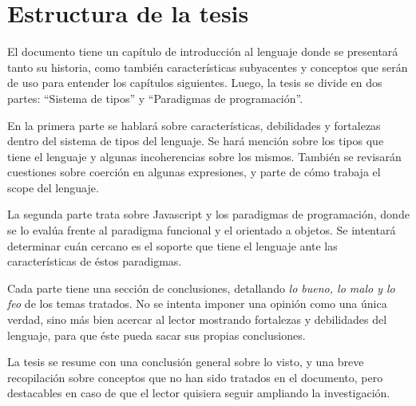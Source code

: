 
\section{Estructura de la tesis}

El documento tiene un capítulo de introducción al lenguaje donde se presentará tanto su historia, como también características subyacentes y conceptos que serán de uso para entender los capítulos siguientes. Luego, la tesis se divide en dos partes: "`Sistema de tipos"' y "`Paradigmas de programación"'. 

En la primera parte se hablará sobre características, debilidades y fortalezas dentro del sistema de tipos del lenguaje. Se hará mención sobre los tipos que tiene el lenguaje y algunas incoherencias sobre los mismos. También se revisarán cuestiones sobre coerción en algunas expresiones, y parte de cómo trabaja el scope del lenguaje.

La segunda parte trata sobre Javascript y los paradigmas de programación, donde se lo evalúa frente al paradigma funcional y el orientado a objetos. Se intentará determinar cuán cercano es el soporte que tiene el lenguaje ante las características de éstos paradigmas.

Cada parte tiene una sección de conclusiones, detallando \textit{lo bueno, lo malo y lo feo} de los temas tratados. No se intenta imponer una opinión como una única verdad, sino más bien acercar al lector mostrando fortalezas y debilidades del lenguaje, para que éste pueda sacar sus propias conclusiones.

La tesis se resume con una conclusión general sobre lo visto, y una breve recopilación sobre conceptos que no han sido tratados en el documento, pero destacables en caso de que el lector quisiera seguir ampliando la investigación.